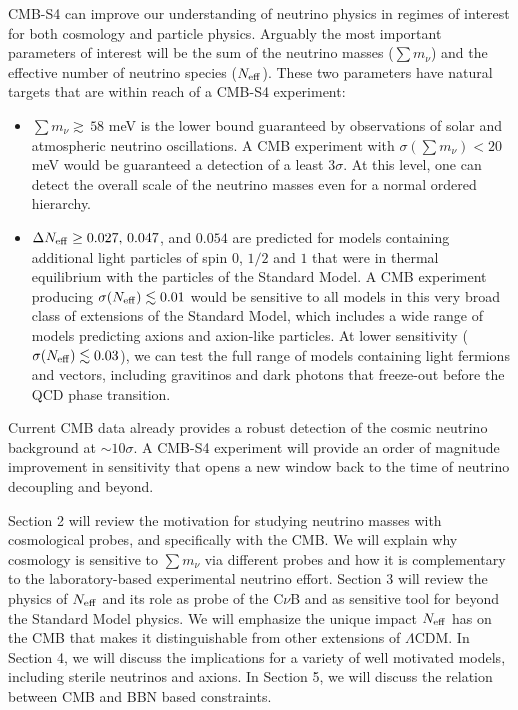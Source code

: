 CMB-S4 can improve our understanding of neutrino physics in regimes of interest for both cosmology and particle physics.  Arguably the most important parameters of interest will be the sum of the neutrino masses ($\sum m_\nu$) and the effective number of neutrino species ($N_{\rm eff}$).  These two parameters have natural targets that are within reach of a CMB-S4 experiment:
\begin{itemize}
\item $ \sum m_\nu \gtrsim \, 58$ meV is the lower bound guaranteed by observations of solar and atmospheric neutrino oscillations.  A CMB experiment with $\sigma(\sum m_\nu) < 20$ meV would be guaranteed a detection of a least 3$\sigma$.  At this level, one can detect the overall scale of the neutrino masses even for a normal ordered hierarchy.
\item $\Delta N_{\rm eff} \geq  0.027, \, 0.047$, and $0.054$ are predicted for models containing additional light particles of spin $0$, $1/2$ and $1$ that were in thermal equilibrium with the particles of the Standard Model.  A CMB experiment producing $\sigma(N_{\rm eff}) \lesssim 0.01$ would be sensitive to all models in this very broad class of extensions of the Standard Model, which includes a wide range of models predicting axions and axion-like particles.  At lower sensitivity ($\sigma(N_{\rm eff}) \lesssim 0.03$), we can test the full range of models containing light fermions and vectors, including gravitinos and dark photons that freeze-out before the QCD phase transition.  
\end{itemize}
Current CMB data already provides a robust detection of the cosmic neutrino background at $\sim10 \sigma$.  A CMB-S4 experiment will provide an order of magnitude improvement in sensitivity that opens a new window back to the time of neutrino decoupling and beyond.

Section 2 will review the motivation for studying neutrino masses with cosmological probes, and specifically with the CMB.  We will explain why cosmology is sensitive to $\sum m_\nu$ via different probes and how it is complementary to the laboratory-based experimental neutrino effort.  Section 3 will review the physics of $N_{\rm eff}$ and its role as probe of the C$\nu$B and as sensitive tool for beyond the Standard Model physics.  We will emphasize the unique impact $N_{\rm eff}$ has on the CMB that makes it distinguishable from other extensions of $\Lambda$CDM.  In Section 4, we will discuss the implications for a variety of well motivated models, including sterile neutrinos and axions.  In Section 5, we will discuss the relation between CMB and BBN based constraints.  


